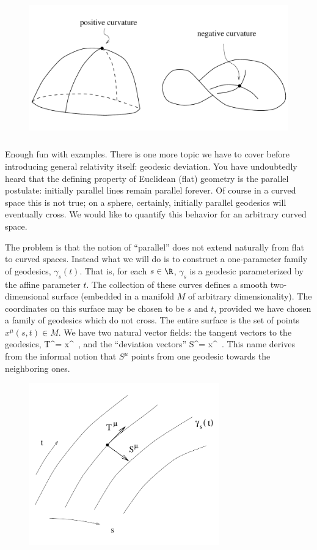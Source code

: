 \documentclass[12pt]{article}
\begin{document}
\begin{figure}
  \centerline{
  \includegraphics[height=6cm]{pdf/three13}}
\end{figure}

Enough fun with examples.  There is one more topic we have to cover
before introducing general relativity itself: geodesic deviation.
You have undoubtedly heard that the defining property of Euclidean (flat)
geometry is the parallel postulate: initially parallel lines remain
parallel forever.  Of course in a curved space this is not true; on
a sphere, certainly, initially parallel geodesics will eventually
cross.  We would like to quantify this behavior for an arbitrary
curved space.

The problem is that the notion of ``parallel'' does not extend
naturally from flat to curved spaces.  Instead what we will do is
to construct a one-parameter family of geodesics, $\gamma_s(t)$.
That is, for each $s\in\R$, $\gamma_s$ is a geodesic parameterized
by the affine parameter $t$.
The collection of these curves defines a smooth two-dimensional
surface (embedded in a manifold $M$ of arbitrary dimensionality).  The
coordinates on this surface may be chosen to be $s$ and $t$, provided
we have chosen a family of geodesics which do not cross.  The entire
surface is the set of points $x^\mu(s,t)\in M$.  We have two natural
vector fields: the tangent vectors to the geodesics,
\be
  T^\mu = {{\partial x^\mu}}\ ,\label{3.107}
\ee
and the ``deviation vectors''
\be
  S^\mu = {{\partial x^\mu}}\ .\label{3.108}
\ee
This name derives from the informal notion that $S^\mu$ points
from one geodesic towards the neighboring ones.

\begin{figure}
  \centerline{
  \includegraphics[height=7cm]{pdf/three14}}
\end{figure}
\end{document}
